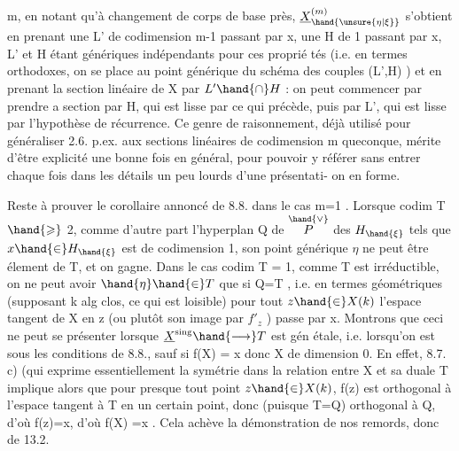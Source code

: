
\placedmargin{|}m, en notant qu'à changement de corps de base près, $\underline{X}^{(m)}_{\hand{\unsure{\eta|\xi}}}$ s'obtient en
prenant une L' de codimension m-1 passant par x, une H de 
1 passant par x, L' et H étant génériques indépendants pour ces proprié
tés (i.e. en termes orthodoxes, on se place au point générique du 
schéma des couples (L',H)  ) et en prenant la section linéaire
de X par $L'\hand{\cap} H$ : on peut commencer par prendre a section par H, qui
est lisse par ce qui précède, puis par L', qui est lisse par l'hypothèse
de récurrence. Ce genre de raisonnement, déjà utilisé pour généraliser
2.6. p.ex. aux sections linéaires de codimension m queconque, mérite
d'être explicité une bonne fois en général, pour pouvoir y référer sans
entrer  chaque fois dans les détails un peu lourds d'une présentati-%
on en forme.

Reste à prouver le corollaire annoncé de 8.8. dans le cas m=1 .
Lorsque  codim T $\hand{\geqslant}$ 2, comme d'autre part l'hyperplan Q de $\overset{\hand{\vee}}{P}$ des
$H_{\hand{\xi}}$ tels que $x\hand{\in} H_{\hand{\xi}}$ est de codimension 1, son point générique $\eta$ ne peut
être élement de T, et on gagne. Dans le cas codim T = 1, comme T est
irréductible, on ne peut avoir $\hand{\eta}\hand{\in} T$ que si Q=T ,
i.e. en termes géométriques  (supposant k alg clos, ce qui est loisible) pour tout $z\hand{\in} X(k)$ l'espace tangent
de X en z (ou plutôt son image par $f'_{z}$ ) passe par x. Montrons que
ceci ne peut se présenter lorsque $\underline{X}^{\mathrm{sing}}\hand{\longrightarrow}T$ est gén étale, i.e.
lorsqu'on est sous les conditions de 8.8., sauf si f(X) = \hand{\{}x\hand{\}} donc X
de dimension 0. En effet, 8.7. c) (qui exprime essentiellement la
symétrie  dans la relation entre X et sa duale T\hand{)} implique alors que
pour presque tout point $z\hand{\in} X(k)$, f(z) est orthogonal à l'espace tangent
à T en un certain point, donc (puisque T=Q) orthogonal à Q, d'où f(z)=x, d'où
f(X) =\hand{\{}x\hand{\}} . Cela achève la démonstration de nos remords, donc de 13.2.

